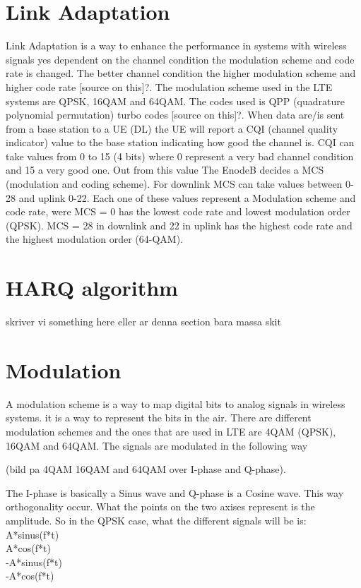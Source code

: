 \documentclass[cropmarks, frame, english]{idamasterthesis}
\begin{document}
\section{Link Adaptation}
Link Adaptation is a way to enhance the performance in systems with wireless signals yes dependent on the channel condition the modulation scheme and code rate is changed. The better channel condition the higher modulation scheme and higher code rate [source on this]?. The modulation scheme used in the LTE systems are QPSK, 16QAM and 64QAM. The codes used is QPP (quadrature polynomial permutation) turbo codes [source on this]?. When data are/is sent from a base station to a UE (DL) the UE will report a CQI (channel quality indicator) value to the base station indicating how good the channel is. CQI can take values from 0 to 15 (4 bits) where 0 represent a very bad channel condition and 15 a very good one. Out from this value The EnodeB decides a MCS (modulation and coding scheme). For downlink MCS can take values between 0-28 and uplink 0-22. Each one of these values represent a Modulation scheme and code rate, were MCS = 0 has the lowest code rate and lowest modulation order (QPSK). MCS = 28 in downlink and 22 in uplink has the highest code rate and the highest modulation order (64-QAM).

\section{HARQ algorithm}
skriver vi something here eller ar denna section bara massa skit

\section{Modulation}
A modulation scheme is a way to map digital bits to analog signals in wireless systems. it is a way to represent the bits in the air.
There are different modulation schemes and the ones that are used in LTE are 4QAM (QPSK), 16QAM and 64QAM. The signals are modulated in the following way 

(bild pa 4QAM 16QAM and 64QAM over I-phase and Q-phase). 
 
The I-phase is basically a Sinus wave and Q-phase is a Cosine wave. This way orthogonality occur. What the points on the two axises represent is the amplitude. So in the QPSK case, what the different signals will be is:\\
 A*sinus(f*t)\\
 A*cos(f*t)\\
 -A*sinus(f*t) \\  
 -A*cos(f*t)\\
 
\end{document}
